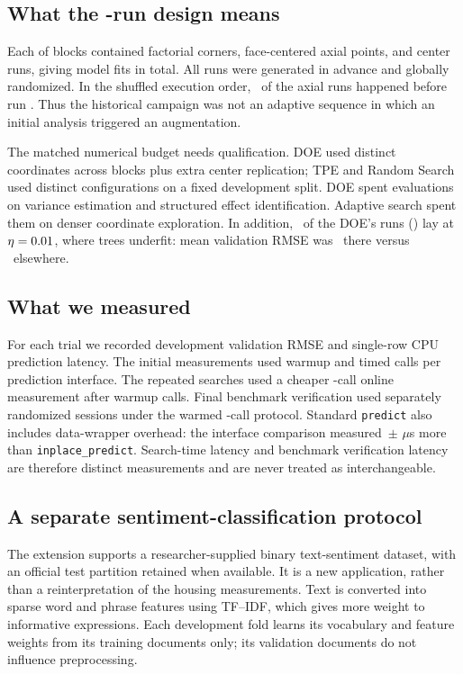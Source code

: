 \documentclass[12pt,a4paper]{article}
\begin{document}
\subsection{What the \numPubDesignRuns{}-run design means}
Each of \numPubBlocks{} blocks contained \numPubCorners{} factorial corners, \numPubAxial{} face-centered axial points, and \numPubCenters{} center runs, giving \numPubDesignRuns{} model fits in total. All runs were generated in advance and globally randomized. In the shuffled execution order, \numDoeAxialBeforeHundred\ of the \numPubAxialTotal{} axial runs happened before run \numPubScreeningRuns{}. Thus the historical campaign was not an adaptive sequence in which an initial analysis triggered an augmentation.

The matched numerical budget needs qualification. DOE used \numPubCoordinates{} distinct coordinates across \numPubBlocks{} blocks plus extra center replication; TPE and Random Search used \numPubDesignRuns{} distinct configurations on a fixed development split. DOE spent evaluations on variance estimation and structured effect identification. Adaptive search spent them on denser coordinate exploration. In addition, \numDoeLowEtaCount\ of the DOE's \numPubDesignRuns{} runs (\numDoeLowEtaPct) lay at $\eta=0.01$, where \numPubTrees{} trees underfit: mean validation RMSE was \numDoeLowEtaMeanRMSE\ there versus \numDoeHighEtaMeanRMSE\ elsewhere.

\subsection{What we measured}
For each trial we recorded development validation RMSE and single-row CPU prediction latency. The initial measurements used warmup and \numPubPrimaryCalls{} timed calls per prediction interface. The repeated searches used a cheaper \numPubOnlineCalls{}-call online measurement after \numPubOnlineWarmups{} warmup calls. Final benchmark verification used \numPubPrimarySessions{} separately randomized sessions under the warmed \numPubPrimaryCalls{}-call protocol. Standard \texttt{predict} also includes data-wrapper overhead: the interface comparison measured \numRevInterfaceOverhead\,$\pm$\,\numRevInterfaceOverheadSd\,$\mu$s more than \texttt{inplace\_predict}. Search-time latency and benchmark verification latency are therefore distinct measurements and are never treated as interchangeable.

\subsection{A separate sentiment-classification protocol}
The extension supports a researcher-supplied binary text-sentiment dataset, with an official test partition retained when available. It is a new application, rather than a reinterpretation of the housing measurements. Text is converted into sparse word and phrase features using TF--IDF, which gives more weight to informative expressions. Each development fold learns its vocabulary and feature weights from its training documents only; its validation documents do not influence preprocessing.
\end{document}
